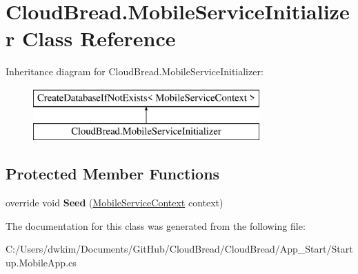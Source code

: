 \hypertarget{a00148}{}\section{Cloud\+Bread.\+Mobile\+Service\+Initializer Class Reference}
\label{a00148}
Inheritance diagram for Cloud\+Bread.\+Mobile\+Service\+Initializer\+:\begin{figure}[H]
\begin{center}
\leavevmode
\includegraphics[height=2.000000cm]{a00148}
\end{center}
\end{figure}
\subsection*{Protected Member Functions}
\begin{DoxyCompactItemize}
\item 
override void {\bfseries Seed} (\hyperlink{a00147}{Mobile\+Service\+Context} context)\hypertarget{a00148_ae60e6b723e7504c5be27b1f35b54501d}{}\label{a00148_ae60e6b723e7504c5be27b1f35b54501d}

\end{DoxyCompactItemize}


The documentation for this class was generated from the following file\+:\begin{DoxyCompactItemize}
\item 
C\+:/\+Users/dwkim/\+Documents/\+Git\+Hub/\+Cloud\+Bread/\+Cloud\+Bread/\+App\+\_\+\+Start/Startup.\+Mobile\+App.\+cs\end{DoxyCompactItemize}
